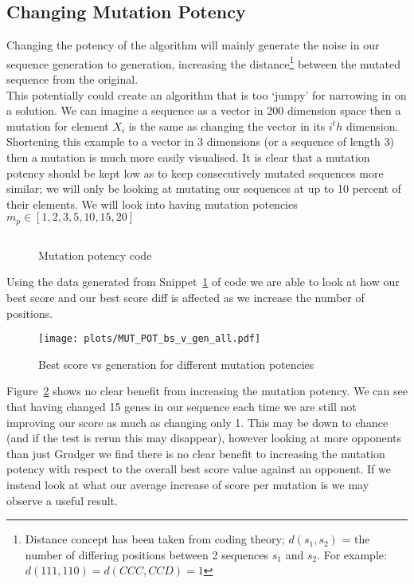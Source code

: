 \subsection{Changing Mutation Potency}\label{subsec:changingMutationPotency}
Changing the potency of the algorithm will mainly generate the noise in our sequence generation to generation, increasing the distance\footnote{Distance concept has been taken from coding theory; \(d(s_1,s_2)\) = the number of differing positions between 2 sequences \(s_1\) and \(s_2\).
For example: \(d(111,110) = d(CCC,CCD) = 1 \)} between the mutated sequence from the original.\\

This potentially could create an algorithm that is too `jumpy' for narrowing in on a solution.
We can imagine a sequence as a vector in 200 dimension space then a mutation for element \(X_i\) is the same as changing the vector in its \(i^th\) dimension.
Shortening this example to a vector in 3 dimensions (or a sequence of length 3) then a mutation is much more easily visualised.
It is clear that a mutation potency should be kept low as to keep consecutively mutated sequences more similar;
we will only be looking at mutating our sequences at up to 10 percent of their elements.
We will look into having mutation potencies \(m_p \in [1,2,3,5,10,15,20]\)\\

\begin{figure}
    \inputminted{python}{code_snippets/mutationPotencyChecker.py}
    \caption{Mutation potency code}\label{code:mutationPotencyChecker}
\end{figure}

Using the data generated from Snippet~\ref{code:mutationPotencyChecker} of code we are able to look at how our best score and our best score diff is affected as we increase the number of positions.\\

\begin{figure}[h]
    \texttt{[image: plots/MUT\_POT\_bs\_v\_gen\_all.pdf]}
    \caption{Best score vs generation for different mutation potencies}\label{fig:MUT-POT-bs-v-gen-all}
\end{figure}

Figure~\ref{fig:MUT-POT-bs-v-gen-all} shows no clear benefit from increasing the mutation potency.
We can see that having changed 15 genes in our sequence each time we are still not improving our score as much as changing only 1.
This may be down to chance (and if the test is rerun this may disappear), however looking at more opponents than just Grudger we find there is no clear benefit to increasing the mutation potency with respect to the overall best score value against an opponent.
If we instead look at what our average increase of score per mutation is we may observe a useful result.\\

